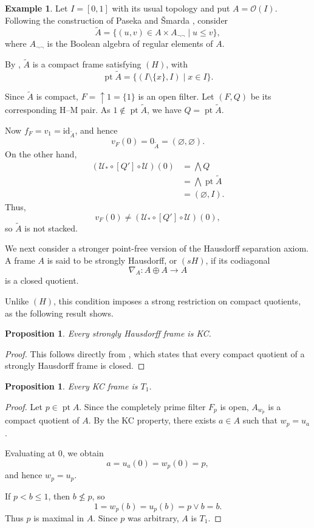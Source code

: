 \documentclass[11pt]{amsart}
\DeclareMathOperator{\pt}{pt}
\theoremstyle{plain}
\newtheorem{prop}[thm]{Proposition}
\theoremstyle{definition}
\newtheorem{ej}[thm]{Example}
\begin{document}
\begin{ej}\label{HnoS}
Let $I=[0,1]$ with its usual topology and
put $A=\mathcal O(I)$. Following the
construction of Paseka and Šmarda
\cite[Proposition 2.3]{PasekaSmarda1992}, consider
\[
\widetilde A
=\{(u,v)\in A\times A_{\neg\neg}\mid u\leq v\},
\]
where $A_{\neg\neg}$ is the Boolean algebra
of regular elements of $A$.

By \cite[Propositions 2.3 and 2.4]{PasekaSmarda1992},
$\widetilde A$ is a compact frame satisfying
$(H)$, with
\[
\pt\widetilde A
=\{(I\setminus\{x\},I)\mid x\in I\}.
\]

Since $\widetilde A$ is compact,
$F=\uparrow1=\{1\}$ is an open filter.
Let $(F,Q)$ be its corresponding H--M pair.
As $1\notin\pt\widetilde A$, we have
$Q=\pt\widetilde A$.

Now $f_F=v_1=\mathrm{id}_{\widetilde A}$,
and hence
\[
v_F(0)=0_{\widetilde A}
=(\varnothing,\varnothing).
\]
On the other hand,
\[
\begin{aligned}
(\mathcal U_*\circ[Q']\circ\mathcal U)(0)
&=\bigwedge Q\\
&=\bigwedge\pt\widetilde A\\
&=(\varnothing,I).
\end{aligned}
\]
Thus,
\[
v_F(0)\neq
(\mathcal U_*\circ[Q']\circ\mathcal U)(0),
\]
so $\widetilde A$ is not stacked.
\end{ej}

We next consider a stronger point-free
version of the Hausdorff separation axiom.
A frame $A$ is said to be strongly Hausdorff,
or $(sH)$, if its codiagonal
\[
\nabla_A:A\oplus A\longrightarrow A
\]
is a closed quotient.

Unlike $(H)$, this condition imposes
a strong restriction on compact quotients,
as the following result shows.


\begin{prop}\label{sHimplicaKC}
Every strongly Hausdorff frame is KC.
\end{prop}

\begin{proof}
This follows directly from
\cite[Theorem III 9.2.1]{picado2021separation}, which states
that every compact quotient of a strongly
Hausdorff frame is closed.
\end{proof}

\begin{prop}\label{KCimplicaT1}
Every KC frame is $T_1$.
\end{prop}

\begin{proof}
Let $p\in\pt A$. Since the completely
prime filter $F_p$ is open, $A_{w_p}$
is a compact quotient of $A$.
By the KC property, there exists $a\in A$
such that $w_p=u_a$.

Evaluating at $0$, we obtain
\[
a=u_a(0)=w_p(0)=p,
\]
and hence $w_p=u_p$.

If $p<b\leq1$, then $b\nleq p$, so
\[
1=w_p(b)=u_p(b)=p\vee b=b.
\]
Thus $p$ is maximal in $A$. Since
$p$ was arbitrary, $A$ is $T_1$.
\end{proof}
\end{document}
